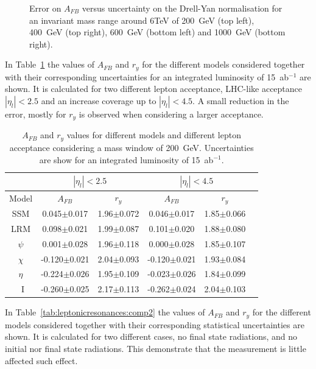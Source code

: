 \begin{figure}[!htb]
  \caption{Error on $A_{FB}$ versus uncertainty on the Drell-Yan normalisation for an invariant mass range around 6TeV of 200~GeV (top left),  400~GeV (top right), 600~GeV (bottom left) and 1000~GeV (bottom right).}
  \label{figure:lepana:afb_bgerr}
\end{figure}

\noindent In Table~\ref{tab:leptonicresonances:comp1} the values of $A_{FB}$ and $r_y$ for the different models considered together with their corresponding uncertainties for an integrated luminosity of 15~ab$^{-1}$ are shown. 
It is calculated for two different lepton acceptance, LHC-like acceptance $|\eta_l|<2.5$ and an increase coverage up to $|\eta_l|<4.5$. A small reduction in the error, mostly for $r_y$ is observed when considering a larger acceptance.

\begin{table}
\caption{$A_{FB}$ and $r_y$ values for different models and different lepton acceptance considering a mass window of 200~GeV. Uncertainties are show for an integrated luminosity of 15~ab$^{-1}$.}

\centering
\begin{tabular}{| c | c | c | c | c | c | |} 
\hline\hline
 & \multicolumn{2}{c|}{$|\eta_l|<2.5$}  & \multicolumn{2}{c|}{$|\eta_l|<4.5$} \\

\hline
  Model &  $A_{FB}$            &  $r_y$                  &  $A_{FB}$             &  $r_y$                 \\
\hline
SSM    &  0.045$\pm$0.017 & 1.96$\pm$0.072  & 0.046$\pm$0.017 & 1.85$\pm$0.066   \\
LRM    &  0.098$\pm$0.021 & 1.99$\pm$0.087  & 0.101$\pm$0.020 & 1.88$\pm$0.080   \\
$\psi$  &  0.001$\pm$0.028  & 1.96$\pm$0.118 & 0.000$\pm$0.028 & 1.85$\pm$0.107    \\
$\chi$  & -0.120$\pm$0.021  & 2.04$\pm$0.093 & -0.120$\pm$0.021 & 1.93$\pm$0.084   \\
$\eta$  & -0.224$\pm$0.026  & 1.95$\pm$0.109 & -0.023$\pm$0.026 & 1.84$\pm$0.099   \\
~I         & -0.260$\pm$0.025 & 2.17$\pm$0.113  & -0.262$\pm$0.024 & 2.04$\pm$0.103   \\
\hline\hline
\end{tabular}
\label{tab:leptonicresonances:comp1}
\end{table}

\noindent In Table~\ref{tab:leptonicresonances:comp2} the values of $A_{FB}$ and $r_y$ for the different models considered together with their corresponding statistical uncertainties are shown. 
It is calculated for two different cases, no final state radiations, and no initial nor final state radiations. This demonstrate that the measurement is little affected such effect.

